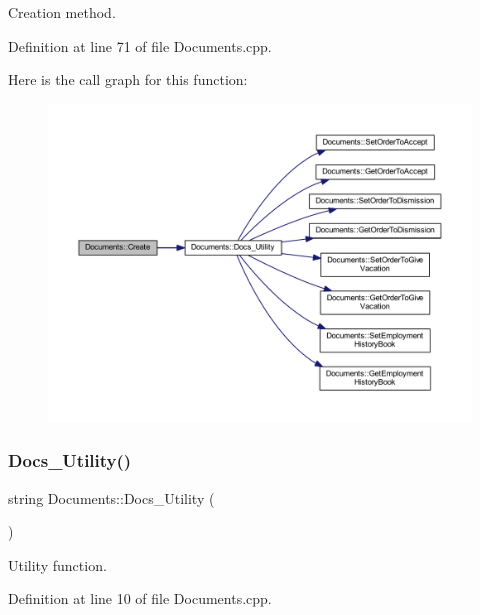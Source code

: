 Creation method. 



Definition at line 71 of file Documents.\+cpp.

Here is the call graph for this function\+:
\nopagebreak
\begin{figure}[H]
\begin{center}
\leavevmode
\includegraphics[width=350pt]{class_documents_a524740a8fbe3933562d63c9999c0cb53_cgraph}
\end{center}
\end{figure}
\mbox{\label{class_documents_a7f06bda36f9fe48a22a8c511aa1e2d06}} 
\subsubsection{\texorpdfstring{Docs\+\_\+\+Utility()}{Docs\_Utility()}}
{\footnotesize\ttfamily string Documents\+::\+Docs\+\_\+\+Utility (\begin{DoxyParamCaption}{ }\end{DoxyParamCaption})\hspace{0.3cm}{\ttfamily [private]}}



Utility function. 



Definition at line 10 of file Documents.\+cpp.


